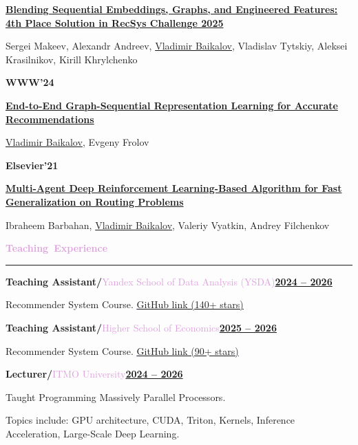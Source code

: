 \documentclass[12pt,a4paper]{extarticle}
\newcommand{\cvsection}[1]{%
    \vspace{1mm}
    \par\noindent\hbox{\Large{\textcolor{Plum}
    {\textbf{#1}}}}\vspace{2mm}\hrule\vspace{2mm}
}
\newcommand{\pubfirst}[3]{%
    \vspace{1mm}
    \noindent
    \begin{minipage}[t]{24mm}
        \textbf{\large #1}
    \end{minipage}%
    \hspace{3mm}%
    \begin{minipage}[t]{\dimexpr\linewidth-30mm\relax}
        {\large\textbf{#2}}\par
        \vspace{0.8mm}
        #3
    \end{minipage}
    \par\vspace{3mm}
}
\newcommand{\pubnext}[2]{%
    \noindent
    \hspace*{27mm}%
    \begin{minipage}[t]{\dimexpr\linewidth-33mm\relax}
        {\large\textbf{#1}}\par
        \vspace{0.8mm}
        #2
    \end{minipage}
    \par\vspace{3mm}
}
\begin{document}
\pubnext
{\href{https://dl.acm.org/doi/full/10.1145/3758126.3758131}{Blending Sequential Embeddings, Graphs, and Engineered Features: 4th Place Solution in RecSys Challenge 2025}}
{Sergei Makeev, Alexandr Andreev, \underline{Vladimir Baikalov}, Vladislav Tytskiy, Aleksei Krasilnikov, Kirill Khrylchenko}

\pubfirst{WWW'24}
{\href{https://arxiv.org/abs/2403.00895}{End-to-End Graph-Sequential Representation Learning for Accurate Recommendations}}
{\underline{Vladimir Baikalov}, Evgeny Frolov}

\pubfirst{Elsevier'21}
{\href{https://aaltodoc.aalto.fi/handle/123456789/111642}{Multi-Agent Deep Reinforcement Learning-Based Algorithm for Fast Generalization on Routing Problems}}
{Ibraheem Barbahan, \underline{Vladimir Baikalov}, Valeriy Vyatkin, Andrey Filchenkov}

\vspace{1mm}

\cvsection{Teaching Experience}

\textbf{\large{Teaching Assistant/}}\textcolor{Plum}{Yandex School of Data Analysis (YSDA)}\hfill\textbf{\underline{2024 -- 2026}}

Recommender System Course.
\textcolor{Blue}{\underline{\href{https://github.com/yandexdataschool/recsys_course}{GitHub link (140+ stars)}}}

\vspace{2mm}

\textbf{\large{Teaching Assistant/}}\textcolor{Plum}{Higher School of Economics}\hfill\textbf{\underline{2025 -- 2026}}

Recommender System Course. \textcolor{Blue}{
\underline{
\href{https://github.com/KhrylchenkoKirill/DeepRecSys}{GitHub link (90+ stars)}
}
}

\vspace{2mm}

\textbf{\large{Lecturer/}}\textcolor{Plum}{ITMO University}\hfill\textbf{\underline{2024 -- 2026}}

Taught Programming Massively Parallel Processors.

Topics include: GPU architecture, CUDA, Triton, Kernels, Inference Acceleration, Large-Scale Deep Learning.

\vspace{1mm}
\end{document}
